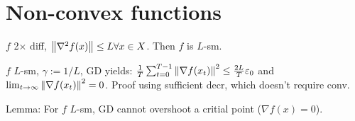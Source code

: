 \section*{Non-convex functions}

$f$ 2$\times$ diff, $\left\lVert \nabla^2 f(x) \right\rVert \leq L \forall x \in X$. Then $f$ is $L$-sm.

$f$ $L$-sm, $\gamma := 1/L$, GD yields: $\frac{1}{T} \sum_{t=0}^{T-1} \left\lVert \nabla f(x_t) \right\rVert^2 \leq \frac{2L}{T} \varepsilon_0$ and $\lim_{t\to\infty} \left\lVert \nabla f(x_t) \right\rVert^2 = 0$. Proof using sufficient decr, which doesn't require conv.

Lemma: For $f$ $L$-sm, GD cannot overshoot a critial point ($\nabla f(x) = 0$).



